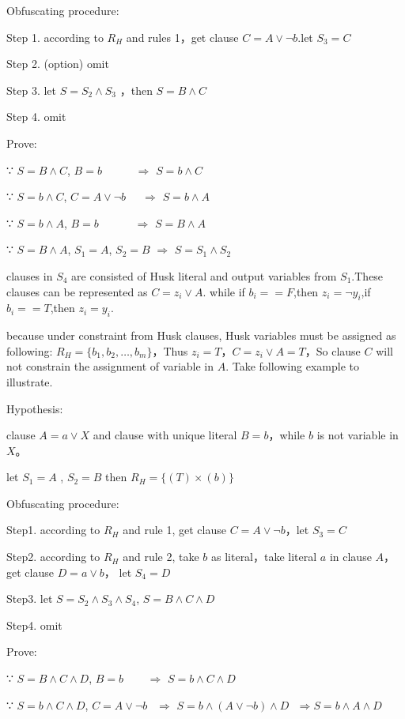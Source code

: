 \documentclass[runningheads,a4paper]{llncs}
\begin{document}
\noindent Obfuscating procedure:

Step 1. according to $R_H$ and rules 1，get clause $C=A\vee \neg b$.let $S_3=C$

Step 2. (option) omit

Step 3. let $S=S_2\wedge S_3$ ，then $S=B\wedge C$

Step 4. omit

\noindent Prove:

∵ $S=B\wedge C$, $B=b$ $~~~~~~~~~~~~\Longrightarrow$ $S=b\wedge C$   

∵ $S=b\wedge C$, $C=A\vee \neg b$ $~~~~~\Longrightarrow$ $S=b\wedge A$  

∵ $S=b\wedge A$, $B=b$ $~~~~~~~~~~~~~\Longrightarrow$ $S=B\wedge A$

∵ $S=B\wedge A$, $S_1 =A$, $S_2=B$ $\Longrightarrow$ $S=S_1\wedge S_2$ 

clauses in $S_4$ are consisted of Husk literal and output variables from $S_1$.These clauses can be represented as $C= z_i\vee A$. while if $b_i==F$,then $z_i= \neg y_i$,if $b_i ==T$,then $z_i =y_i$.

because under constraint from Husk clauses, Husk variables  must be assigned as following: 
$R_H=\{b_1,b_2,\dots,b_m\}$，Thus $z_i=T$，$C=z_i\vee A=T$，So clause $C$ will not constrain the assignment of variable in $A$.
Take following example to illustrate.

\noindent Hypothesis: 

clause $A=a\vee X$ and clause with unique literal $B=b$，while $b$ is not variable in $X$。

let $S_1=A$ , $S_2=B$  then $R_H=\{(T)\times(b)\}$ 

\noindent Obfuscating procedure:

Step1. according to $R_H$ and rule 1, get clause $C=A\vee \neg b$，let $S_3=C$

Step2. according to $R_H$ and rule 2, take $b$ as literal，take literal $a$ in clause $A$，get clause $D=a\vee b$， let $S_4=D$

Step3. let $S=S_2 \wedge S_3\wedge S_4$, $S=B\wedge C\wedge D$

Step4. omit

\noindent Prove:

∵ $S=B\wedge C\wedge D$, $B=b$ $~~~~~~~~\Longrightarrow$ $S=b\wedge C\wedge D$

∵ $S=b\wedge C\wedge D$, $C=A\vee \neg b$ $~~\Longrightarrow$ $S=b\wedge (A\vee \neg b)\wedge D ~~~\Longrightarrow S=b\wedge A\wedge D$
\end{document}
